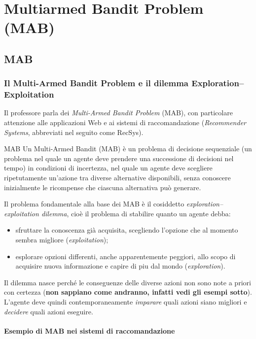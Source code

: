 \chapter{Multiarmed Bandit Problem (MAB)}
\section{MAB}

\subsection{Il Multi-Armed Bandit Problem e il dilemma Exploration--Exploitation}

Il professore parla dei \emph{Multi-Armed Bandit Problem} (MAB), con particolare attenzione alle applicazioni Web e ai sistemi di raccomandazione (\emph{Recommender Systems}, abbreviati nel seguito come RecSys).

\begin{definition}{MAB}
    Un Multi-Armed Bandit (MAB) è un problema di decisione sequenziale (un problema nel quale un agente deve prendere una successione di decisioni nel tempo) in condizioni di incertezza, nel quale un agente deve scegliere ripetutamente un'azione tra diverse alternative disponibili, senza conoscere inizialmente le ricompense che ciascuna alternativa può generare.
\end{definition}

Il problema fondamentale alla base dei MAB è il cosiddetto \emph{exploration--exploitation dilemma}, cioè il problema di stabilire quanto un agente debba:
\begin{itemize}
    \item sfruttare la conoscenza già acquisita, scegliendo l'opzione che al momento sembra migliore (\emph{exploitation});
    \item esplorare opzioni differenti, anche apparentemente peggiori, allo scopo di acquisire nuova informazione e capire di piu dal mondo (\emph{exploration}).
\end{itemize}

Il dilemma nasce perché le conseguenze delle diverse azioni non sono note a priori con certezza (\textbf{non sappiano come andranno, infatti vedi gli esempi sotto}). L'agente deve quindi contemporaneamente \emph{imparare} quali azioni siano migliori e \emph{decidere} quali azioni eseguire.

\subsubsection{Esempio di MAB nei sistemi di raccomandazione}

